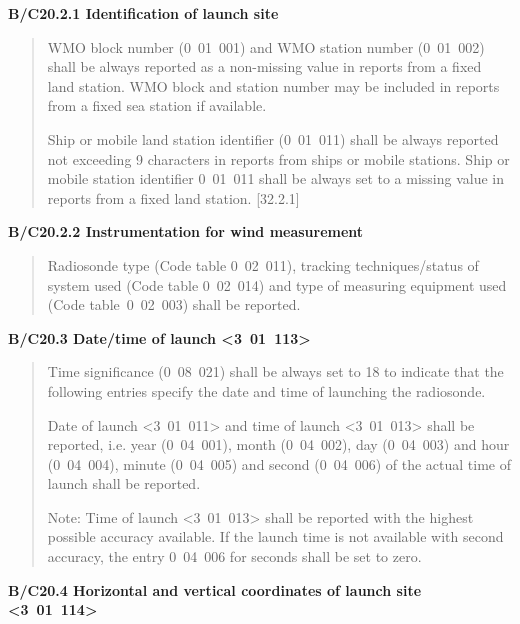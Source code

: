 \textbf{B/C20.2.1 Identification of launch site}

\begin{quote}
WMO block number (0~01~001) and WMO station number (0~01~002) shall be always reported as a non-missing value in reports from a fixed land station. WMO block and station number may be included in reports from a fixed sea station if available.

Ship or mobile land station identifier (0~01~011) shall be always reported not exceeding 9 characters in reports from ships or mobile stations. Ship or mobile station identifier 0~01~011 shall be always set to a missing value in reports from a fixed land station. {[}32.2.1{]}
\end{quote}

\textbf{B/C20.2.2 Instrumentation for wind measurement}

\begin{quote}
Radiosonde type (Code table 0~02~011), tracking techniques/status of system used (Code table 0~02~014) and type of measuring equipment used (Code table~0~02~003) shall be reported.
\end{quote}

\textbf{B/C20.3 Date/time of launch \textless3~01~113\textgreater{}}

\begin{quote}
Time significance (0~08~021) shall be always set to 18 to indicate that the following entries specify the date and time of launching the radiosonde.

Date of launch \textless3~01~011\textgreater{} and time of launch \textless3~01~013\textgreater{} shall be reported, i.e. year (0~04~001), month (0~04~002), day (0~04~003) and hour (0~04~004), minute (0~04~005) and second (0~04~006) of the actual time of launch shall be reported.

Note: Time of launch \textless3~01~013\textgreater{} shall be reported with the highest possible accuracy available. If the launch time is not available with second accuracy, the entry 0~04~006 for seconds shall be set to zero.
\end{quote}

\textbf{B/C20.4 Horizontal and vertical coordinates of launch site \textless3~01~114\textgreater{}}

